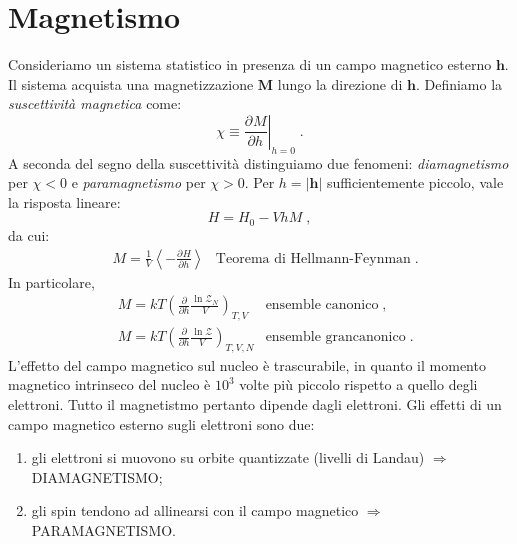 \documentclass[10pt,a4paper]{report}
\theoremstyle{definition}
\newcommand{\pdev}[3][]{\frac{\partial^{#1} #2}{\partial #3^{#1}}}
\numberwithin{equation}{section}
\newcommand{\zpart}{\mathcal{Z}}
\begin{document}
\section{Magnetismo}
Consideriamo un sistema statistico in presenza di un campo magnetico esterno $\mathbf{h}$. Il sistema acquista una magnetizzazione $\mathbf{M}$ lungo la direzione di $\mathbf{h}$. Definiamo la \emph{suscettività magnetica} come:
\begin{equation}
\chi\equiv \left.\pdev{M}{h}\right|_{h=0}\;.
\end{equation}
A seconda del segno della suscettività distinguiamo due fenomeni: \emph{diamagnetismo} per $\chi<0$ e  \emph{paramagnetismo} per $\chi>0$. Per $h=|\mathbf{h}|$ sufficientemente piccolo, vale la risposta lineare:
\begin{equation}
H=H_0-VhM\;,
\end{equation}
da cui:
\begin{align}
&\boxed{M=\frac{1}{V}\left\langle -\pdev{H}{h}\right\rangle} &\mbox{Teorema di Hellmann-Feynman}\;.
\end{align}
In particolare,
\begin{align*}
& M=kT\left(\frac{\partial}{\partial h}\frac{\ln \zpart_N}{V}\right)_{T,V} & \mbox{ensemble canonico}\;, \\
& M=kT\left(\frac{\partial}{\partial h}\frac{\ln\zpart}{V}\right)_{T,V,N} & \mbox{ensemble grancanonico}\;.
\end{align*}
L'effetto del campo magnetico sul nucleo è trascurabile, in quanto il momento magnetico intrinseco del nucleo è $10^3$ volte più piccolo rispetto a quello degli elettroni. Tutto il magnetistmo pertanto dipende dagli elettroni. Gli effetti di un campo magnetico esterno sugli elettroni sono due:
\begin{enumerate}
\item gli elettroni si muovono su orbite quantizzate (livelli di Landau) $\Longrightarrow$ DIAMAGNETISMO;
\item gli spin tendono ad allinearsi con il campo magnetico $\Longrightarrow$ PARAMAGNETISMO.
\end{enumerate}
\end{document}
